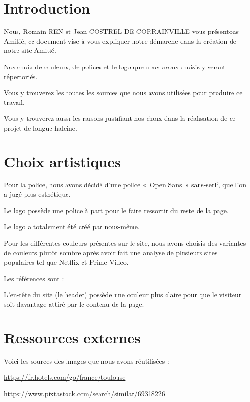\documentclass[12pt]{article}
\begin{document}
    {\selectfont
    \begin{adjustwidth}{20pt}{20pt}
    \tableofcontents
    \newpage
    \section{Introduction}
    Nous, Romain REN et Jean COSTREL DE CORRAINVILLE vous présentons Amitié, ce document vise à vous expliquer notre démarche dans la création de notre site Amitié.\bigskip

    Nos choix de couleurs, de polices et le logo que nous avons choisis y seront répertoriés.\bigskip
    
    Vous y trouverez les toutes les sources que nous avons utilisées pour produire ce travail.\bigskip
    
    Vous y trouverez aussi les raisons justifiant nos choix dans la réalisation de ce projet de longue haleine.\bigskip

    \section{Choix artistiques}
    Pour la police, nous avons décidé d’une police « Open Sans » sans-serif, que l’on a jugé plus esthétique.\bigskip

    Le logo possède une police à part pour le faire ressortir du reste de la page.\bigskip
    
    Le logo a totalement été créé par nous-même.\bigskip
    
    Pour les différentes couleurs présentes sur le site, nous avons choisis des variantes de couleurs plutôt sombre après avoir fait une analyse de plusieurs sites populaires tel que Netflix et Prime Video.\bigskip
    
    Les références sont : \bigskip
    
    L’en-tête du site (le header) possède une couleur plus claire pour que le visiteur soit davantage attiré par le contenu de la page.\bigskip

    \section{Ressources externes}
    Voici les sources des images que nous avons réutilisées :\bigskip
    
    \url{https://fr.hotels.com/go/france/toulouse}\bigskip
    
    \url{https://www.pixtastock.com/search/similar/69318226} \bigskip
    

\end{adjustwidth}}
\end{document}
